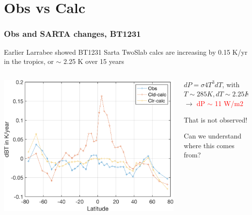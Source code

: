 \documentclass[10pt,t]{beamer}
\begin{document}
\section{Obs vs Calc}
\begin{frame}
  \frametitle{Obs and SARTA changes, BT1231}

  Earlier Larrabee showed BT1231 Sarta TwoSlab calcs are increasing by
  0.15 K/yr in the tropics, or $\sim$ 2.25 K over 15 years \newline

  \begin{columns}
    \begin{column}{0.65\columnwidth}
      \begin{center}
        \noindent\includegraphics[width=\linewidth]{airs15year_lat_trends_900cm-1.png}
      \end{center}
    \end{column}

    \begin{column}{0.35\columnwidth}

      \vspace{0.1in}
      
      $dP = \sigma 4 T^3 dT$, with $T \sim 285 K, dT \sim 2.25 K $ $\rightarrow $
      \textcolor{red}{dP $\sim$ 11 W/m2} \newline

      That is not observed! \newline
      
      \vspace{0.1in}
      
      Can we understand where this comes from?

    \end{column}    
  \end{columns}
  
\end{frame}
\end{document}
